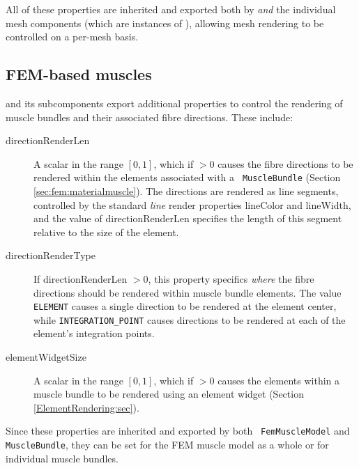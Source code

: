 All of these properties are inherited and exported both by
 {\it and} the individual mesh components (which are
instances of ), allowing mesh rendering
to be controlled on a per-mesh basis.



\subsection{FEM-based muscles}

 and its subcomponents
 export additional
properties to control the rendering of muscle bundles and their
associated fibre directions. These include:

\begin{description}

\item[directionRenderLen]\mbox{}

A scalar in the range $[0,1]$, which if $> 0$ causes the fibre
directions to be rendered within the elements associated with a {\tt
MuscleBundle} (Section \ref{sec:fem:materialmuscle}). The directions
are rendered as line segments, controlled by the standard {\it line}
render properties {\sf lineColor} and {\sf lineWidth}, and the value
of {\sf directionRenderLen} specifies the length of this segment
relative to the size of the element.

\item[directionRenderType]\mbox{}

If {\sf directionRenderLen} $> 0$, this property specifics {\it
where} the fibre directions should be rendered within muscle bundle
elements. The value {\tt ELEMENT} causes a single direction to be
rendered at the element center, while {\tt INTEGRATION\_POINT} causes
directions to be rendered at each of the element's integration points.

\item[elementWidgetSize]\mbox{}

A scalar in the range $[0,1]$, which if $> 0$ causes the elements
within a muscle bundle to be rendered using an element widget (Section
\ref{ElementRendering:sec}).

\end{description}

Since these properties are inherited and exported by both {\tt
FemMuscleModel} and {\tt MuscleBundle}, they can be set for the FEM
muscle model as a whole or for individual muscle bundles.

